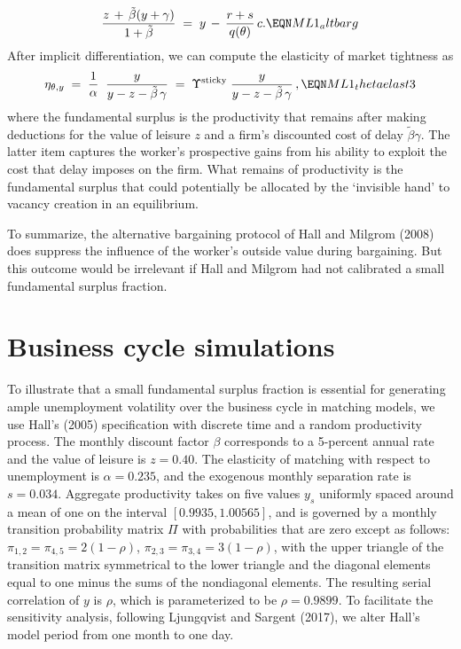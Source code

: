 $$
{ z\,+\,\tilde \beta(y+\gamma) \over 1+\tilde \beta }  \;=\;
y \,-\, {r + s \over q(\theta)} \, c .       \EQN ML1_altbarg
$$
After implicit differentiation,
we can compute the elasticity of market tightness as
$$
\eta_{\theta,y}
\;=\; {1 \over \alpha} \; \;
      {y \over y-z- \tilde \beta \,\gamma}
\;=\; \Upsilon^{\rm sticky}\;
         {y \over y-z- \tilde \beta \,\gamma}\,,  \EQN ML1_thetaelast3
$$
where the fundamental surplus is the productivity
that remains after making deductions for the value of leisure $z$
and a firm's discounted cost of delay $\tilde \beta \gamma$.
The latter item
captures the worker's prospective gains from his
 ability to exploit the
cost that delay imposes on the firm.  What remains of productivity is the
fundamental surplus that could potentially be allocated by the
`invisible hand'  to  vacancy creation in an equilibrium.

To summarize, the alternative bargaining
protocol of Hall and Milgrom (2008) does suppress the influence of the
worker's outside value during bargaining. But
this outcome would be irrelevant if  Hall and Milgrom had  not
calibrated a small fundamental surplus fraction.







\section{Business cycle simulations}\label{sec:FS_simulations}%
%
To illustrate that a small fundamental surplus fraction is essential for
generating ample unemployment volatility over the business cycle in
matching models, we use  Hall's (2005) specification
with discrete time and a  random productivity process.
The monthly discount factor $\beta$ corresponds to a 5-percent annual
rate and the value of leisure is $z=0.40$. The elasticity of
matching with respect to unemployment is $\alpha=0.235$, and the
exogenous monthly separation rate is $s=0.034$. Aggregate productivity
takes on five  values $y_s$ uniformly spaced around a mean of
one on the interval $[0.9935, 1.00565]$, and is governed by
a monthly transition probability matrix $\Pi$ with probabilities
that are zero except as follows: $\pi_{1,2}=\pi_{4,5}=2(1-\rho)$,
$\pi_{2,3}=\pi_{3,4}=3(1-\rho)$, with the upper triangle of the
transition matrix symmetrical to the lower triangle and the
diagonal elements equal to one minus the sums of the nondiagonal
elements. The resulting serial correlation of $y$ is $\rho$, which
is parameterized to be $\rho=0.9899$.
To facilitate the
sensitivity analysis, following Ljungqvist and Sargent (2017), we alter
Hall's model period from one month to one day.




